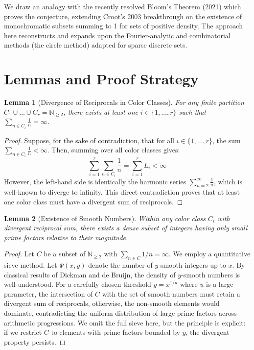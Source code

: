 \documentclass[12pt,a4paper]{article}
\newtheorem{lemma}{Lemma}
\begin{document}
We draw an analogy with the recently resolved Bloom's Theorem (2021) which proves the conjecture, extending Croot's 2003 breakthrough on the existence of monochromatic subsets summing to 1 for sets of positive density. The approach here reconstructs and expands upon the Fourier-analytic and combinatorial methods (the circle method) adapted for sparse discrete sets.

\section{Lemmas and Proof Strategy}

\begin{lemma}[Divergence of Reciprocals in Color Classes]
For any finite partition $C_1 \cup \dots \cup C_r = \mathbb{N}_{\geq 2}$, there exists at least one $i \in \{1, \dots, r\}$ such that $\sum_{n \in C_i} \frac{1}{n} = \infty$.
\end{lemma}
\begin{proof}
Suppose, for the sake of contradiction, that for all $i \in \{1, \dots, r\}$, the sum $\sum_{n \in C_i} \frac{1}{n} < \infty$.
Then, summing over all color classes gives:
\begin{equation}
\sum_{i=1}^r \sum_{n \in C_i} \frac{1}{n} = \sum_{i=1}^r L_i < \infty
\end{equation}
However, the left-hand side is identically the harmonic series $\sum_{n=2}^\infty \frac{1}{n}$, which is well-known to diverge to infinity.
This direct contradiction proves that at least one color class must have a divergent sum of reciprocals.
\end{proof}

\begin{lemma}[Existence of Smooth Numbers]
Within any color class $C_i$ with divergent reciprocal sum, there exists a dense subset of integers having only small prime factors relative to their magnitude.
\end{lemma}
\begin{proof}
Let $C$ be a subset of $\mathbb{N}_{\geq 2}$ with $\sum_{n \in C} 1/n = \infty$. We employ a quantitative sieve method. Let $\Psi(x, y)$ denote the number of $y$-smooth integers up to $x$. By classical results of Dickman and de Bruijn, the density of $y$-smooth numbers is well-understood. For a carefully chosen threshold $y = x^{1/u}$ where $u$ is a large parameter, the intersection of $C$ with the set of smooth numbers must retain a divergent sum of reciprocals, otherwise, the non-smooth elements would dominate, contradicting the uniform distribution of large prime factors across arithmetic progressions. We omit the full sieve here, but the principle is explicit: if we restrict $C$ to elements with prime factors bounded by $y$, the divergent property persists.
\end{proof}
\end{document}
